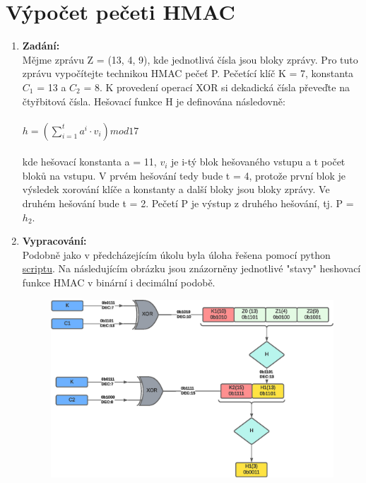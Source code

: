 \documentclass[10pt, a4paper]{article}%
\begin{document}
	\section*{\large{\textbf{Výpočet pečeti HMAC}}}
		\begin{enumerate}
			\item \textbf{Zadání:}\\
				Mějme zprávu Z = (13, 4, 9), kde jednotlivá čísla jsou bloky zprávy. Pro tuto zprávu vypočítejte
				technikou HMAC pečeť P. Pečetící klíč K = 7, konstanta $C_1$ = 13 a $C_2$ = 8. K provedení operací
				XOR si dekadická čísla převeďte na čtyřbitová čísla. Hešovací funkce H je definována následovně:\\\\
				$h = \left( \sum_{i = 1}^{t}  a^i \cdot v_i \right) mod 17$\\\\
				kde hešovací konstanta a = 11, $v_i$ je i-tý blok hešovaného vstupu a t počet bloků na vstupu. V prvém
				hešování tedy bude t = 4, protože první blok je výsledek xorování klíče a konstanty a další bloky
				jsou bloky zprávy. Ve druhém hešování bude t = 2. Pečetí P je výstup z druhého hešování, tj. P = $h_2$.
				\item \textbf{Vypracování:}\\
				Podobně jako v předcházejícím úkolu byla úloha řešena pomocí python
				\href{https://github.com/FilipPaul/ctvrtak_letni_semestr/tree/main/MKC_NSB/ukol1_kryptografie}{\color{blue} scriptu}.
				Na následujícím obrázku jsou znázorněny jednotlivé "stavy" heshovací funkce HMAC v binární i decimální podobě.
				\begin{figure}[ht!]
					\centering
					\includegraphics[width = 1\textwidth]{HMAC_drawing.eps}
				\end{figure}
		\end{enumerate}
\end{document}
